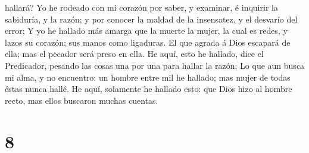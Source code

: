 hallará?  Yo he rodeado con mi corazón por saber, y
examinar, é inquirir la sabiduría, y la razón; y por conocer la maldad
de la insensatez, y el desvarío del error;  Y yo he
hallado más amarga que la muerte la mujer, la cual es redes, y lazos su
corazón; sus manos como ligaduras. El que agrada á Dios escapará de
ella; mas el pecador será preso en ella.  He aquí, esto
he hallado, dice el Predicador, pesando las cosas una por una para
hallar la razón;  Lo que aun busca mi alma, y no
encuentro: un hombre entre mil he hallado; mas mujer de todas éstas
nunca hallé.  He aquí, solamente he hallado esto: que
Dios hizo al hombre recto, mas ellos buscaron muchas cuentas.

\hypertarget{section-7}{%
\section{8}\label{section-7}}

